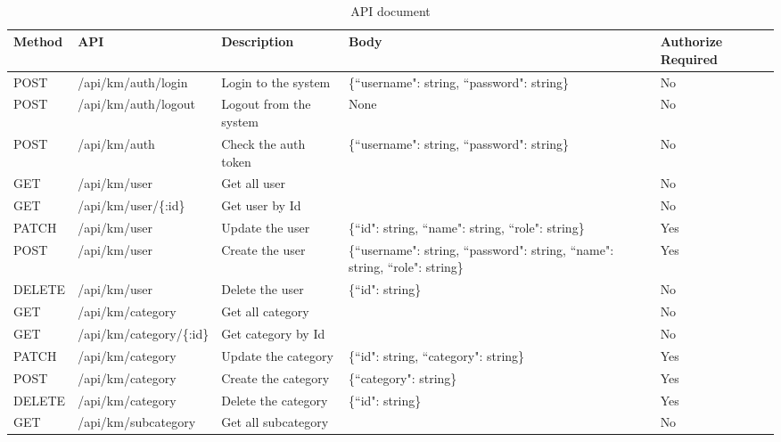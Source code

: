 \documentclass[12pt,oneside,openright,a4paper]{cpe-english-project}
\begin{document}
 \\

\begin{table}[h]
	\centering
	\caption{API document}
	\label{tab:api_document}
	\begin{adjustbox}{width=\textwidth}
		\begin{tabular}{|l|l|l|l|l|}
		\hline
		Method 	& API 						& Description 				& Body 											 & Authorize Required \\ \hline
		POST	& /api/km/auth/login 		& Login to the system 		& \{``username": string, ``password": string\} 		 & No \\ \hline
		POST	& /api/km/auth/logout 		& Logout from the system 	& None 											 & No \\ \hline
		POST	& /api/km/auth 				& Check the auth token 		& \{``username": string, ``password": string\} 		 & No \\ \hline
		GET		& /api/km/user 				& Get all user 				& 												 & No \\ \hline
		GET		& /api/km/user/\{:id\} 		& Get user by Id 			& 												 & No \\ \hline
		PATCH	& /api/km/user 				& Update the user 			& \{``id": string, ``name": string, ``role": string\} & Yes \\ \hline
		POST	& /api/km/user 				& Create the user 			& \{``username": string, ``password": string, ``name": string, ``role": string\} & Yes \\ \hline
		DELETE	& /api/km/user 				& Delete the user 			& \{``id": string\} 								& No \\ \hline
		GET		& /api/km/category 			& Get all category 			& 												& No \\ \hline
		GET		& /api/km/category/\{:id\} 	& Get category by Id 		& 												& No \\ \hline
		PATCH	& /api/km/category 			& Update the category 		& \{``id": string, ``category": string\}			& Yes \\ \hline
		POST	& /api/km/category 			& Create the category 		& \{``category": string\} 							& Yes \\ \hline
		DELETE	& /api/km/category 			& Delete the category 		& \{``id": string\} 								& Yes \\ \hline
		GET		& /api/km/subcategory 		& Get all subcategory 		& 												& No \\ \hline

\end{tabular}
\end{adjustbox}
\end{table}
\end{document}

